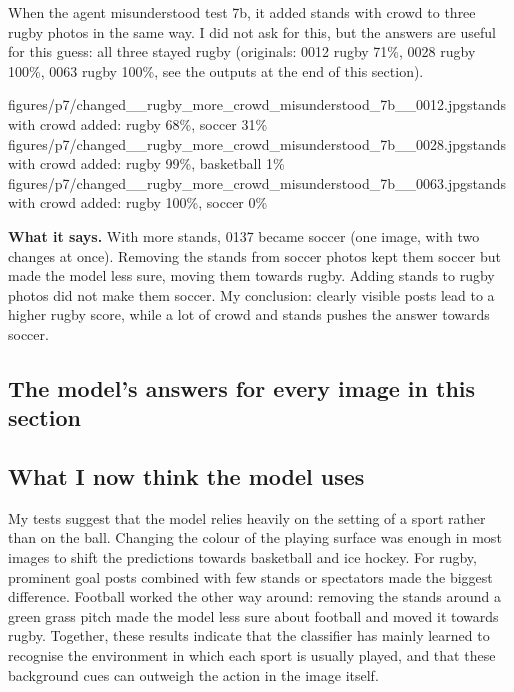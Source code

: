 \documentclass[11pt]{article}
\begin{document}
When the agent misunderstood test 7b, it added stands with crowd to three rugby
photos in the same way. I did not ask for this, but the answers are useful for this
guess: all three stayed rugby (originals: 0012 rugby 71\%, 0028 rugby 100\%, 0063
rugby 100\%, see the outputs at the end of this section).

           {figures/p7/changed__rugby_more_crowd_misunderstood_7b__0012.jpg}{stands with crowd added: rugby 68\%, soccer 31\%}
           {figures/p7/changed__rugby_more_crowd_misunderstood_7b__0028.jpg}{stands with crowd added: rugby 99\%, basketball 1\%}
           {figures/p7/changed__rugby_more_crowd_misunderstood_7b__0063.jpg}{stands with crowd added: rugby 100\%, soccer 0\%}

\textbf{What it says.} With more stands, 0137 became soccer (one image, with two
changes at once). Removing the stands from soccer photos kept them soccer but made
the model less sure, moving them towards rugby. Adding stands to rugby photos did
not make them soccer. My conclusion: clearly visible posts lead to a higher rugby
score, while a lot of crowd and stands pushes the answer towards soccer.

\subsection*{The model's answers for every image in this section}

\subsection*{What I now think the model uses}
My tests suggest that the model relies heavily on the setting of a sport rather
than on the ball. Changing the colour of the playing surface was enough in most
images to shift the predictions towards basketball and ice hockey. For rugby,
prominent goal posts combined with few stands or spectators made the biggest
difference. Football worked the other way around: removing the stands around a
green grass pitch made the model less sure about football and moved it towards
rugby. Together, these results indicate that the classifier has mainly learned to
recognise the environment in which each sport is usually played, and that these
background cues can outweigh the action in the image itself.
\end{document}
